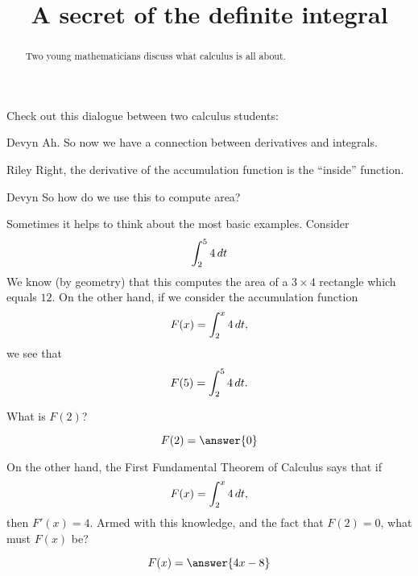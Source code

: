 \documentclass{ximera}
\title[Break-Ground:]{A secret of the definite integral}
\begin{document}
\begin{abstract}
Two young mathematicians discuss what calculus is all about.
\end{abstract}
\maketitle

Check out this dialogue between two calculus students:

\begin{dialogue}
\item[Devyn] Ah. So now we have a connection between derivatives and
  integrals.
\item[Riley] Right, the derivative of the accumulation function is the
  ``inside'' function.
\item[Devyn] So how do we use this to compute area?
\end{dialogue}

Sometimes it helps to think about the most basic examples. Consider
\[
\int_2^5 4 \,d t
\]
We know (by geometry) that this computes the area of a $3\times 4$
rectangle which equals $12$. On the other hand, if we consider the
accumulation function
\[
F(x) = \int_2^x 4 \,d t,
\]
we see that
\[
F(5) = \int_2^5 4 \,d t.
\]
\begin{problem}
  What is $F(2)$?
  \begin{prompt}
    \[
    F(2) = \answer{0}
    \]
  \end{prompt}
\end{problem}

\begin{problem}
  On the other hand, the First Fundamental Theorem of Calculus says that if
  \[
  F(x) = \int_2^x 4 \,d t,
  \]
  then $F'(x) = 4$. Armed with this knowledge, and the fact that $F(2)
  = 0$, what must $F(x)$ be?
  \begin{prompt}
    \[
    F(x) = \answer{4x-8}
    \]
  \end{prompt}
\end{problem}






\end{document}
